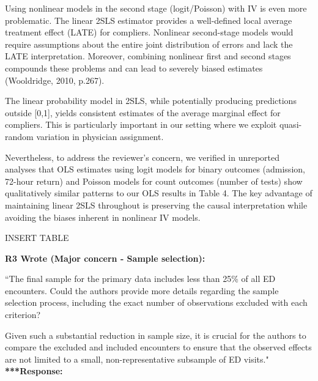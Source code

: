 \documentclass[11pt]{article}
\newenvironment{quote2}
{ \bigskip
\noindent
         \small\em
         \baselineskip=14pt
}
\newcommand{\1}{\hbox{\rm 1\kern-.35em 1}}
\begin{document}
{{Using nonlinear models in the second stage (logit/Poisson) with IV is even more problematic. The linear 2SLS estimator provides a well-defined local average treatment effect (LATE) for compliers. Nonlinear second-stage models would require assumptions about the entire joint distribution of errors and lack the LATE interpretation. Moreover, combining nonlinear first and second stages compounds these problems and can lead to severely biased estimates (Wooldridge, 2010, p.267).

The linear probability model in 2SLS, while potentially producing predictions outside [0,1], yields consistent estimates of the average marginal effect for compliers. This is particularly important in our setting where we exploit quasi-random variation in physician assignment.

Nevertheless, to address the reviewer's concern, we verified in unreported analyses that OLS estimates using logit models for binary outcomes (admission, 72-hour return) and Poisson models for count outcomes (number of tests) show qualitatively similar patterns to our OLS results in Table 4. The key advantage of maintaining linear 2SLS throughout is preserving the causal interpretation while avoiding the biases inherent in nonlinear IV models.}


INSERT TABLE
\color{black}


\begin{quote2}
\textbf{R3 Wrote (Major concern -  Sample selection):}  

\noindent``The final sample for the primary data includes less than 25\% of all ED encounters. Could the authors provide more details regarding the sample selection process, including the exact number of observations excluded with each criterion? 

Given such a substantial reduction in sample size, it is crucial for the authors to compare the excluded and included encounters to ensure that the observed effects are not limited to a small, non-representative subsample of ED visits."
\end{quote2}

\noindent\textbf{***Response:} \color{blue}{We thank the reviewer for highlighting the importance of sample selection transparency. We have added a detailed CONSORT flow diagram (reproduced below and included as Appendix Figure A2) showing the exact number of observations excluded at each step:

}}
\end{document}
